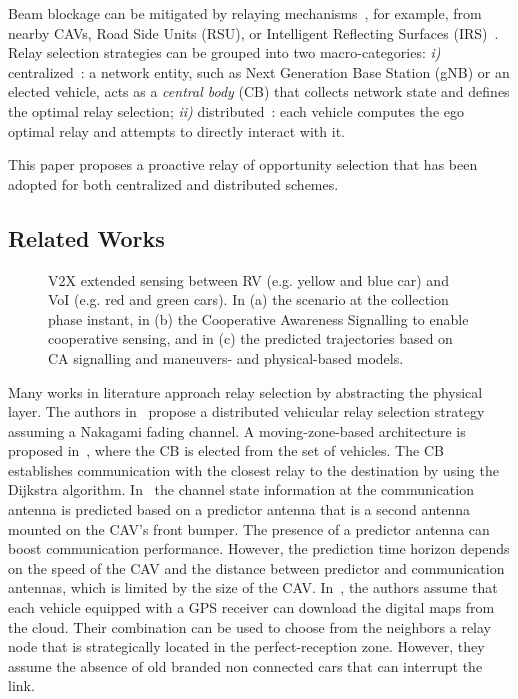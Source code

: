 \documentclass[journal]{IEEEtran}
\begin{document}
Beam blockage can be mitigated by relaying mechanisms~\cite{v2v_multihop_mmwave, routingv2x,TVT_self_org}, for example, from nearby CAVs, Road Side Units (RSU), or Intelligent Reflecting Surfaces (IRS)~\cite{TVT_irs}. Relay selection strategies can be grouped into two macro-categories: \textit{i)} centralized~\cite{gu2019auction, 7516562}: a network entity, such as Next Generation Base Station (gNB) or an elected vehicle, acts as a \textit{central body} (CB) that collects network state and defines the optimal relay selection; \textit{ii)} distributed~\cite{9072416, 4657359, TVT_self_org}: each vehicle computes the ego optimal relay and attempts to directly interact with it. 

This paper proposes a proactive relay of opportunity selection that has been adopted for both centralized and distributed schemes. 

\subsection*{Related Works}

\begin{figure*}[t]
\centering
{} \hspace{0.05 cm}
 \hspace{0.05 cm}
\caption{ V2X extended sensing between RV (e.g. yellow and blue car) and VoI (e.g. red and green cars).
In (a) the scenario at the collection phase instant, in (b) the Cooperative Awareness Signalling to enable cooperative sensing, and in (c) the predicted trajectories based on CA signalling and maneuvers- and physical-based models.}
\label{fig:scenario}
\end{figure*}

Many works in literature approach relay selection by abstracting the physical layer. The authors in~\cite{8662549} propose a distributed vehicular relay selection strategy assuming a Nakagami fading channel. A moving-zone-based architecture is proposed in~\cite{7516562}, where the CB is elected from the set of vehicles. The CB establishes communication with the closest relay to the destination by using the Dijkstra algorithm.
In~\cite{guo2021predictor} the channel state information at the communication antenna is predicted based on a predictor antenna that is a second antenna mounted on the CAV's front bumper. The presence of a predictor antenna can boost communication performance. However, the prediction time horizon depends on the speed of the CAV and the distance between predictor and communication antennas, which is limited by the size of the CAV.
In~\cite{MBR}, the authors assume that each vehicle
equipped with a GPS receiver can download the digital maps from the cloud. Their combination can be used to choose from the neighbors a relay node
that is strategically located in the perfect-reception zone. However, they assume the absence of old branded non connected cars that can interrupt the link.
\end{document}
